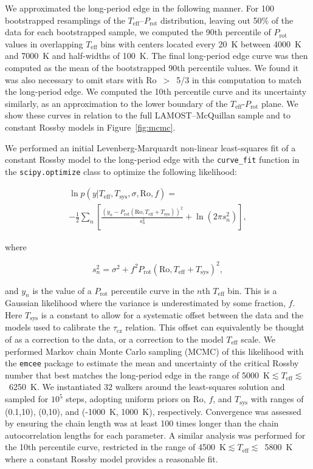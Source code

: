 \documentclass[trackchanges,twocolumn]{aastex631}
\newcommand{\taucz}{$\tau_\mathrm{cz}$\xspace}
\newcommand{\lamostmcq}{LAMOST--McQuillan\xspace}
\newcommand{\teff}{\ensuremath{T_{\mathrm{eff}}}\xspace}
\newcommand{\prot}{\ensuremath{P_\mathrm{rot}}\xspace}
\begin{document}
We approximated the long-period edge in the following manner. For 100 bootstrapped resamplings of the \teff–\prot distribution, leaving out 50\% of the data for each bootstrapped sample, we computed the 90th percentile of \prot values in overlapping \teff bins with centers located every 20~K between 4000~K and 7000~K and half-widths of 100~K. The final long-period edge curve was then computed as the mean of the bootstrapped 90th percentile values. We found it was also necessary to omit stars with Ro~$>$~5/3 in this computation to match the long-period edge. We computed the 10th percentile curve and its uncertainty similarly, as an approximation to the lower boundary of the \teff-\prot plane. We show these curves in relation to the full \lamostmcq sample and to constant Rossby models in Figure~\ref{fig:mcmc}.

We performed an initial Levenberg-Marquardt non-linear least-squares fit of a constant Rossby model to the long-period edge with the \texttt{curve\_fit} function in the \texttt{scipy.optimize} class to optimize the following likelihood: 

\begin{multline} \label{eq:3}
    \ln{p} (y | T_\mathrm{eff}, T_\mathrm{sys}, \sigma, \mathrm{Ro}, f) =\\ -\frac{1}{2}\sum_n \left [ \frac{(y_n - P_\mathrm{rot}(\mathrm{Ro}, T_\mathrm{eff} + T_\mathrm{sys}))^2}{s_n^2}  + \ln{(2\pi s_n^2)} \right ],
\end{multline}

where

\begin{equation} \label{eq:4}
    s_n^2 = \sigma^2 + f^2 P_\mathrm{rot}(\mathrm{Ro}, T_\mathrm{eff} + T_\mathrm{sys})^2,
\end{equation}


and $y_n$ is the value of a \prot percentile curve in the $n$th \teff bin. This is a Gaussian likelihood where the variance is underestimated by some fraction, $f$. Here $T_\mathrm{sys}$ is a constant to allow for a systematic offset between the data and the models used to calibrate the \taucz relation. This offset can equivalently be thought of as a correction to the data, or a correction to the model \teff scale. We performed Markov chain Monte Carlo sampling (MCMC) of this likelihood with the \texttt{emcee} package \citep{emcee2013, emcee2019} to estimate the mean and uncertainty of the critical Rossby number that best matches the long-period edge in the range of 5000~K$\lesssim \teff \lesssim$~6250~K. We instantiated 32 walkers around the least-squares solution and sampled for $10^5$ steps, adopting uniform priors on Ro, $f$, and $T_\mathrm{sys}$ with ranges of (0.1,10), (0,10), and (-1000~K, 1000~K), respectively. Convergence was assessed by ensuring the chain length was at least 100 times longer than the chain autocorrelation lengths for each parameter. A similar analysis was performed for the 10th percentile curve, restricted in the range of 4500~K$\lesssim \teff \lesssim$~5800~K where a constant Rossby model provides a reasonable fit. 
\end{document}
